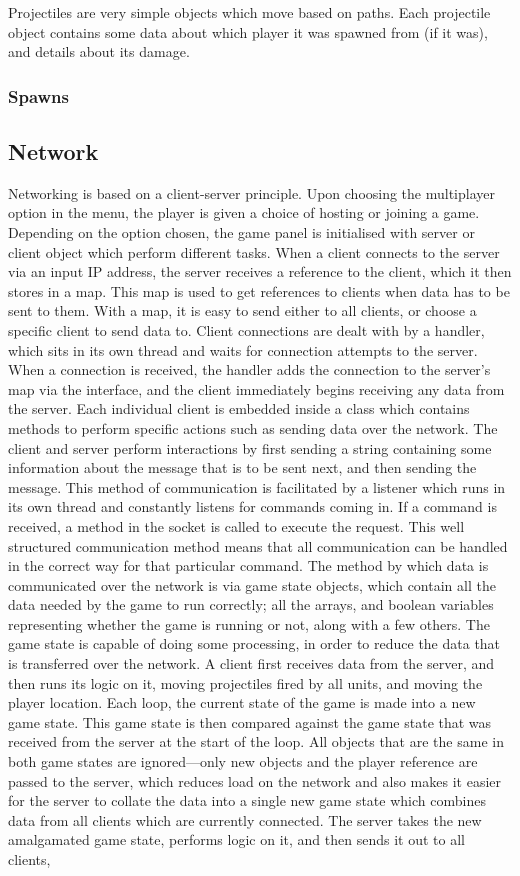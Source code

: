 Projectiles are very simple objects which move based on paths. Each projectile object contains some data about which player it was spawned from (if it was), and details about its damage.
\subsubsection{Spawns}

\subsection{Network}
Networking is based on a client-server principle. Upon choosing the multiplayer option in the menu, the player is given a choice of hosting or joining a game. Depending on the option chosen, the game panel is initialised with server or client object which perform different tasks. When a client connects to the server via an input IP address, the server receives a reference to the client, which it then stores in a map. This map is used to get references to clients when data has to be sent to them. With a map, it is easy to send either to all clients, or choose a specific client to send data to. Client connections are dealt with by a handler, which sits in its own thread and waits for connection attempts to the server. When a connection is received, the handler adds the connection to the server's map via the interface, and the client immediately begins receiving any data from the server. Each individual client is embedded inside a class which contains methods to perform specific actions such as sending data over the network. The client and server perform interactions by first sending a string containing some information about the message that is to be sent next, and then sending the message. This method of communication is facilitated by a listener which runs in its own thread and constantly listens for commands coming in. If a command is received, a method in the socket is called to execute the request. This well structured communication method means that all communication can be handled in the correct way for that particular command. The method by which data is communicated over the network is via game state objects, which contain all the data needed by the game to run correctly; all the arrays, and boolean variables representing whether the game is running or not, along with a few others. The game state is capable of doing some processing, in order to reduce the data that is transferred over the network. A client first receives data from the server, and then runs its logic on it, moving projectiles fired by all units, and moving the player location. Each loop, the current state of the game is made into a new game state. This game state is then compared against the game state that was received from the server at the start of the loop. All objects that are the same in both game states are ignored---only new objects and the player reference are passed to the server, which reduces load on the network and also makes it easier for the server to collate the data into a single new game state which combines data from all clients which are currently connected. The server takes the new amalgamated game state, performs logic on it, and then sends it out to all clients, 